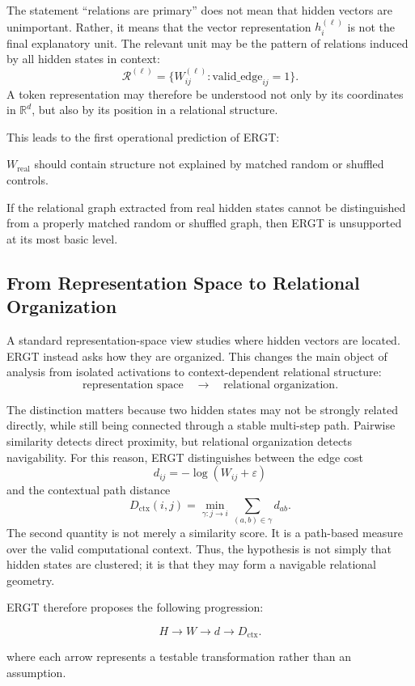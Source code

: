 \documentclass[11pt]{article}
\begin{document}
The statement ``relations are primary'' does not mean that hidden vectors are unimportant. Rather, it means that the vector representation $h_i^{(\ell)}$ is not the final explanatory unit. The relevant unit may be the pattern of relations induced by all hidden states in context:
\[
\mathcal{R}^{(\ell)}
=
\{W_{ij}^{(\ell)}:\mathrm{valid\_edge}_{ij}=1\}.
\]
A token representation may therefore be understood not only by its coordinates in $\mathbb{R}^d$, but also by its position in a relational structure.

This leads to the first operational prediction of ERGT:
\begin{ergtclaim}
$W_{\mathrm{real}}$ should contain structure not explained by matched random or shuffled controls.
\end{ergtclaim}
If the relational graph extracted from real hidden states cannot be distinguished from a properly matched random or shuffled graph, then ERGT is unsupported at its most basic level.

\subsection{From Representation Space to Relational Organization}

A standard representation-space view studies where hidden vectors are located. ERGT instead asks how they are organized. This changes the main object of analysis from isolated activations to context-dependent relational structure:
\[
\text{representation space}
\quad\longrightarrow\quad
\text{relational organization}.
\]

The distinction matters because two hidden states may not be strongly related directly, while still being connected through a stable multi-step path. Pairwise similarity detects direct proximity, but relational organization detects navigability. For this reason, ERGT distinguishes between the edge cost
\[
d_{ij}=-\log(W_{ij}+\varepsilon)
\]
and the contextual path distance
\[
D_{\mathrm{ctx}}(i,j)
=
\min_{\gamma:j\to i}
\sum_{(a,b)\in\gamma}d_{ab}.
\]
The second quantity is not merely a similarity score. It is a path-based measure over the valid computational context. Thus, the hypothesis is not simply that hidden states are clustered; it is that they may form a navigable relational geometry.

ERGT therefore proposes the following progression:
\begin{ergtclaim}
\[
H \rightarrow W \rightarrow d \rightarrow D_{\mathrm{ctx}}.
\]
\end{ergtclaim}
where each arrow represents a testable transformation rather than an assumption.
\end{document}
